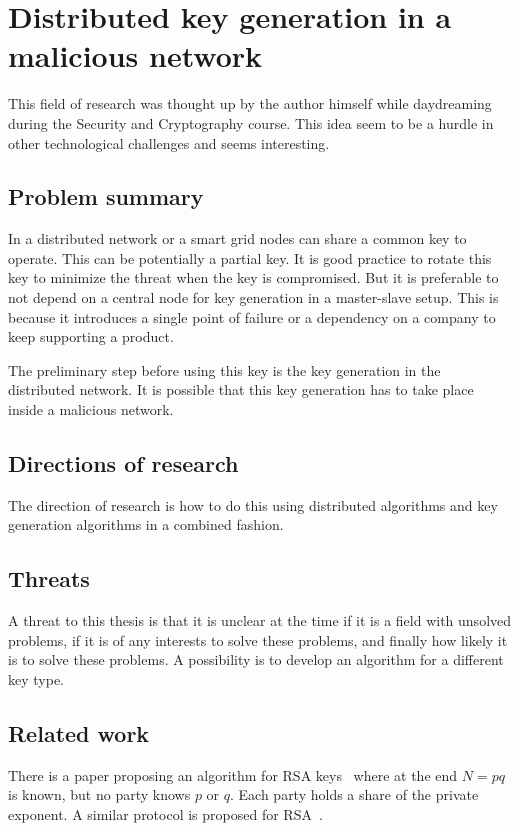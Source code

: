 \section{Distributed key generation in a malicious network}
This field of research was thought up by the author himself while daydreaming during the Security and Cryptography course.
This idea seem to be a hurdle in other technological challenges and seems interesting.

\subsection*{Problem summary}
In a distributed network or a smart grid nodes can share a common key to operate.
This can be potentially a partial key.
It is good practice to rotate this key to minimize the threat when the key is compromised.
But it is preferable to not depend on a central node for key generation in a master-slave setup.
This is because it introduces a single point of failure or a dependency on a company to keep supporting a product.

The preliminary step before using this key is the key generation in the distributed network.
It is possible that this key generation has to take place inside a malicious network.
\subsection*{Directions of research}
The direction of research is how to do this using distributed algorithms and key generation algorithms in a combined fashion.

\subsection*{Threats}
A threat to this thesis is that it is unclear at the time if it is a field with unsolved problems,
if it is of any interests to solve these problems, and finally how likely it is to solve these problems.
A possibility is to develop an algorithm for a different key type.

\subsection*{Related work}
There is a paper proposing an algorithm for RSA keys~\cite{boneh1997efficient} where at the end $N=pq$ is known,
but no party knows $p$ or $q$. Each party holds a share of the private exponent.
A similar protocol is proposed for RSA~\cite{gilboa1999two}.

